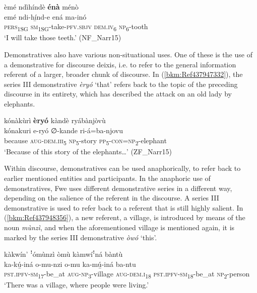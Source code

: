 \ea
\label{bkm:Ref450569612}
èmé ndìhíndè \textbf{énà} ménò\\
\gll emé    ndi-hí̲nd-e    ená    ma-inó\\
\textsc{pers}\textsubscript{1SG}  \textsc{sm}\textsubscript{1SG}-take-\textsc{pfv}.\textsc{sbjv}  \textsc{dem}.\textsc{iv}\textsubscript{6}  \textsc{np}\textsubscript{6}-tooth\\
\glt ‘I will take those teeth.’ (NF\_Narr15)
\z

Demonstratives also have various non-situational uses. One of these is the use of a demonstrative for discourse deixis, i.e. to refer to the general information referent of a larger, broader chunk of discourse. In (\ref{bkm:Ref437947332}), the series III demonstrative \textit{èryó} ‘that’ refers back to the topic of the preceding discourse in its entirety, which has described the attack on an old lady by elephants.

\ea
\label{bkm:Ref437947332}
kónàkùrì \textbf{èryó} kàndè ryábànjòvù\\
\gll kónakuri  e-ryó    ∅-kande  ri-á=ba-njovu\\
because  \textsc{aug}-\textsc{dem}.\textsc{iii}\textsubscript{5}  \textsc{np}\textsubscript{5}-story  \textsc{pp}\textsubscript{5\-}-\textsc{con}=\textsc{np}\textsubscript{2}-elephant\\
\glt ‘Because of this story of the elephants…’ (ZF\_Narr15)
\z

Within discourse, demonstratives can be used anaphorically, to refer back to earlier mentioned entities and participants. In the anaphoric use of demonstratives, Fwe uses different demonstrative series in a different way, depending on the salience of the referent in the discourse. A series III demonstrative is used to refer back to a referent that is still highly salient. In (\ref{bkm:Ref437948356}), a new referent, a village, is introduced by means of the noun \textit{mùnzì}, and when the aforementioned village is mentioned again, it is marked by the series III demonstrative \textit{òwó} ‘this’.


\newpage
\ea
\label{bkm:Ref437948356}
\ea
kàkwín’ ꜝómùnzì òmù kàmwíꜝná bàntù\\
\gll ka-kú̲-iná      o-mu-nzi o-mu    ka-mú̲-iná    ba-ntu\\
\textsc{pst}.\textsc{ipfv}-\textsc{sm}\textsubscript{17}-be\_at    \textsc{aug}-\textsc{np}\textsubscript{3}-village
\textsc{aug}-\textsc{dem}.\textsc{i}\textsubscript{18}  \textsc{pst}.\textsc{ipfv}-\textsc{sm}\textsubscript{18}-be\_at  \textsc{np}\textsubscript{2}-person\\
\glt ‘There was a village, where people were living.’

